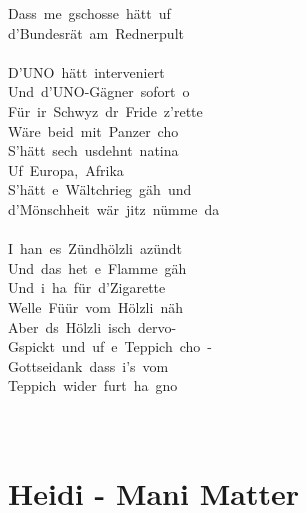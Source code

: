 \documentclass[]{book}
\let\stdsection\section
\renewcommand\section{\clearpage\stdsection}
\begin{document}
Dass~me~gschosse~hätt~uf~\\
d'Bundesrät~am~Rednerpult\\
~\\
D'UNO~hätt~interveniert\\
Und~d'UNO-Gägner~sofort~o\\
Für~ir~Schwyz~dr~Fride~z'rette\\
Wäre~beid~mit~Panzer~cho\\
S'hätt~sech~usdehnt~natina\\
Uf~Europa,~Afrika\\
S'hätt~e~Wältchrieg~gäh~und~\\
d'Mönschheit~wär~jitz~nümme~da\\
~\\
I~han~es~Zündhölzli~azündt\\
Und~das~het~e~Flamme~gäh\\
Und~i~ha~für~d'Zigarette\\
Welle~Füür~vom~Hölzli~näh\\
Aber~ds~Hölzli~isch~dervo-\\
Gspickt~und~uf~e~Teppich~cho~-\\
Gottseidank~dass~i's~vom~\\
Teppich~wider~furt~ha~gno\\
~\\
~\\

\hypertarget{heidi---mani-matter}{%
\section{Heidi - Mani Matter}\label{heidi---mani-matter}}
\end{document}

